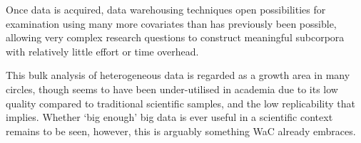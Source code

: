 Once data is acquired, data warehousing techniques open possibilities for examination using many more covariates than has previously been possible, allowing very complex research questions to construct meaningful subcorpora with relatively little effort or time overhead.

This bulk analysis of heterogeneous data is regarded as a growth area in many circles, though seems to have been under-utilised in academia due to its low quality compared to traditional scientific samples, and the low replicability that implies.  Whether `big enough' big data is ever useful in a scientific context remains to be seen, however, this is arguably something WaC already embraces.




